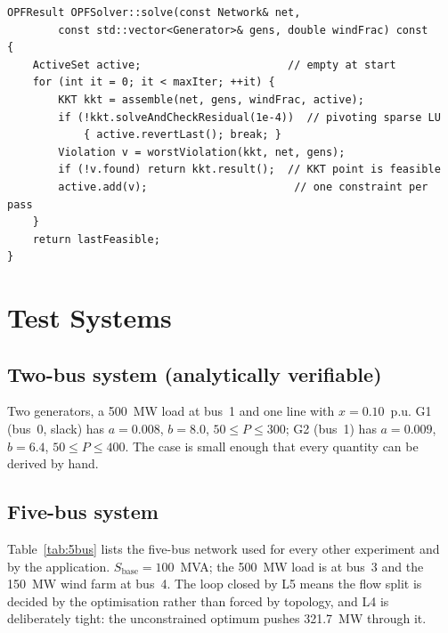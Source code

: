 \documentclass[conference]{IEEEtran}
\begin{document}
\begin{lstlisting}[caption={Active-set loop (abridged from \texttt{OPFSolver.cpp}).},label=lst:as]
OPFResult OPFSolver::solve(const Network& net,
        const std::vector<Generator>& gens, double windFrac) const
{
    ActiveSet active;                       // empty at start
    for (int it = 0; it < maxIter; ++it) {
        KKT kkt = assemble(net, gens, windFrac, active);
        if (!kkt.solveAndCheckResidual(1e-4))  // pivoting sparse LU
            { active.revertLast(); break; }
        Violation v = worstViolation(kkt, net, gens);
        if (!v.found) return kkt.result();  // KKT point is feasible
        active.add(v);                       // one constraint per pass
    }
    return lastFeasible;
}
\end{lstlisting}

\section{Test Systems}
\subsection{Two-bus system (analytically verifiable)}
Two generators, a 500~MW load at bus~1 and one line with $x=0.10$~p.u. G1 (bus~0, slack) has $a=0.008$, $b=8.0$, $50\le P\le 300$; G2 (bus~1) has $a=0.009$, $b=6.4$, $50\le P\le 400$. The case is small enough that every quantity can be derived by hand.

\subsection{Five-bus system}
Table~\ref{tab:5bus} lists the five-bus network used for every other experiment and by the application. $S_{\mathrm{base}}=100$~MVA; the 500~MW load is at bus~3 and the 150~MW wind farm at bus~4. The loop closed by L5 means the flow split is decided by the optimisation rather than forced by topology, and L4 is deliberately tight: the unconstrained optimum pushes 321.7~MW through it.
\end{document}
